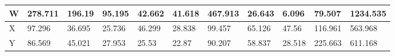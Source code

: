 \begin{landscape}
\begin{longtable}[c]{|l|llllllllll|}
  W                                                                               & \multicolumn{1}{l|}{278.711}                                                        & \multicolumn{1}{l|}{196.19}                                                         & \multicolumn{1}{l|}{95.195}                                                         & \multicolumn{1}{l|}{42.662}                                                         & \multicolumn{1}{l|}{41.618}                                                         & \multicolumn{1}{l|}{467.913}                                                        & \multicolumn{1}{l|}{26.643}                                    & \multicolumn{1}{l|}{6.096}                                     & \multicolumn{1}{l|}{79.507}                                        & 1234.535                                                                               \\ \hline
  X                                                                               & \multicolumn{1}{l|}{97.296}                                                         & \multicolumn{1}{l|}{36.695}                                                         & \multicolumn{1}{l|}{25.736}                                                         & \multicolumn{1}{l|}{46.299}                                                         & \multicolumn{1}{l|}{28.838}                                                         & \multicolumn{1}{l|}{99.457}                                                         & \multicolumn{1}{l|}{65.126}                                    & \multicolumn{1}{l|}{47.56}                                     & \multicolumn{1}{l|}{116.961}                                       & 563.968                                                                                \\ \hline
  Y                                                                               & \multicolumn{1}{l|}{86.569}                                                         & \multicolumn{1}{l|}{45.021}                                                         & \multicolumn{1}{l|}{27.953}                                                         & \multicolumn{1}{l|}{25.53}                                                          & \multicolumn{1}{l|}{22.87}                                                          & \multicolumn{1}{l|}{90.207}                                                         & \multicolumn{1}{l|}{58.837}                                    & \multicolumn{1}{l|}{28.518}                                    & \multicolumn{1}{l|}{225.663}                                       & 611.168                                                                                \\ \hline
  \end{longtable}
  \end{landscape}

